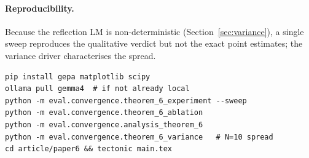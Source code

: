 \paragraph{Reproducibility.}  Because the reflection LM is
non-deterministic (Section~\ref{sec:variance}), a single sweep
reproduces the qualitative verdict but not the exact point
estimates; the variance driver characterises the spread.
\begin{verbatim}
pip install gepa matplotlib scipy
ollama pull gemma4  # if not already local
python -m eval.convergence.theorem_6_experiment --sweep
python -m eval.convergence.theorem_6_ablation
python -m eval.convergence.analysis_theorem_6
python -m eval.convergence.theorem_6_variance   # N=10 spread
cd article/paper6 && tectonic main.tex
\end{verbatim}
